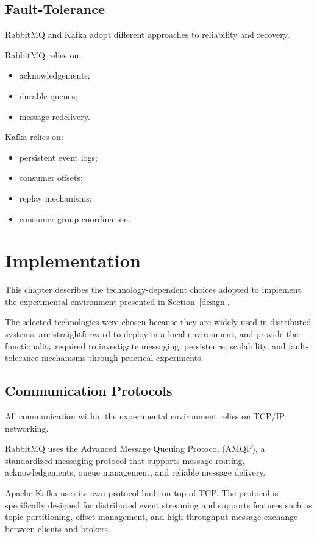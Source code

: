\documentclass{scrartcl}
\begin{document}
\subsection{Fault-Tolerance}\label{fault-tolerance}

RabbitMQ and Kafka adopt different approaches to reliability and recovery.

RabbitMQ relies on:

\begin{itemize}
\item acknowledgements;
\item durable queues;
\item message redelivery.
\end{itemize}

Kafka relies on:

\begin{itemize}
\item persistent event logs;
\item consumer offsets;
\item replay mechanisms;
\item consumer-group coordination.
\end{itemize}


\section{Implementation}

This chapter describes the technology-dependent choices adopted to implement the experimental environment presented in Section~\ref{design}.

The selected technologies were chosen because they are widely used in distributed systems, are straightforward to deploy in a local environment, and provide the functionality required to investigate messaging, persistence, scalability, and fault-tolerance mechanisms through practical experiments.


\subsection{Communication Protocols}

All communication within the experimental environment relies on TCP/IP networking.

RabbitMQ uses the Advanced Message Queuing Protocol (AMQP), a standardized messaging protocol that supports message routing, acknowledgements, queue management, and reliable message delivery.

Apache Kafka uses its own protocol built on top of TCP. The protocol is specifically designed for distributed event streaming and supports features such as topic partitioning, offset management, and high-throughput message exchange between clients and brokers.
\end{document}
